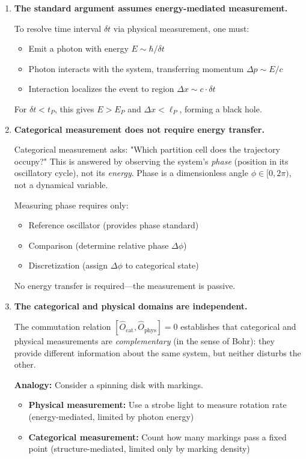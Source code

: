 \documentclass[twocolumn,10pt]{article}
\theoremstyle{remark}
\begin{document}
\begin{enumerate}
    \item \textbf{The standard argument assumes energy-mediated measurement.}

    To resolve time interval $\delta t$ via physical measurement, one must:
    \begin{itemize}
        \item Emit a photon with energy $E \sim \hbar/\delta t$
        \item Photon interacts with the system, transferring momentum $\Delta p \sim E/c$
        \item Interaction localizes the event to region $\Delta x \sim c \cdot \delta t$
    \end{itemize}

    For $\delta t < t_P$, this gives $E > E_P$ and $\Delta x < \ell_P$, forming a black hole.

    \item \textbf{Categorical measurement does not require energy transfer.}

    Categorical measurement asks: "Which partition cell does the trajectory occupy?" This is answered by observing the system's \textit{phase} (position in its oscillatory cycle), not its \textit{energy}. Phase is a dimensionless angle $\phi \in [0, 2\pi)$, not a dynamical variable.

    Measuring phase requires only:
    \begin{itemize}
        \item Reference oscillator (provides phase standard)
        \item Comparison (determine relative phase $\Delta \phi$)
        \item Discretization (assign $\Delta \phi$ to categorical state)
    \end{itemize}

    No energy transfer is required—the measurement is passive.

    \item \textbf{The categorical and physical domains are independent.}

    The commutation relation $[\hat{O}_{\text{cat}}, \hat{O}_{\text{phys}}] = 0$ establishes that categorical and physical measurements are \textit{complementary} (in the sense of Bohr): they provide different information about the same system, but neither disturbs the other.

    \textbf{Analogy:} Consider a spinning disk with markings.
    \begin{itemize}
        \item \textbf{Physical measurement:} Use a strobe light to measure rotation rate (energy-mediated, limited by photon energy)
        \item \textbf{Categorical measurement:} Count how many markings pass a fixed point (structure-mediated, limited only by marking density)
    \end{itemize}


\end{enumerate}
\end{document}
